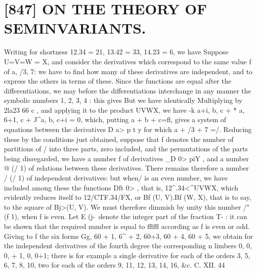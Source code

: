 \documentclass[11pt,a4paper]{book}
\begin{document}
{{\vspace{1em}

\section*{[847] ON THE THEORY OF SEMINVARIANTS.}


Writing for shortness 12.34 = 21, 13.42 = 33, 14.23 = 6, we have Suppose U=V=W = X, and consider the derivatives which correspond to the same value f of a, /3, 7: we have to find how many of these derivatives are independent, and to express the others in terms of these. Since the functions are equal after the differentiations, we may before the differentiations interchange in any manner the symbolic numbers 1, 2, 3, 4 : this gives But we have identically Multiplying by 2la23 66 c , and applying it to the product UVWX, we have -k a+i, b, c + * a, 6+1, c + J^a, b, c+i = 0, which, putting a + b + c=fl, gives a system of equations between the derivatives D a> p t y for which a + /3 + 7 =/. Reducing these by the conditions just obtained, suppose that f denotes the number of partitions of / into three parts, zero included, and the permutations of the parts being disregarded, we have a number f of derivatives _D 0> piY , and a number @ (/ 1) of relations between these derivatives. There remains therefore a number / (/ 1) of independent derivatives: but when/ is an even number, we have included among these the functions Dft 0> , that is, 12^.34<^UVWX, which evidently reduces itself to 12/CTF.34/FX, or Bf (U, V).Bf (W, X), that is to say, to the square of Bj>(U, V). We must therefore dimmish by unity this number /" (f 1), when f is even. Let E (j-\ denote the integer part of the fraction T- : it can be shown that the required number is equal to fflffl according as f is even or odd. Giving to f the six forms Gg, 60 + 1, 6^ + 2, 60+3, 60 + 4, 60 + 5, we obtain for the independent derivatives of the fourth degree the corresponding n limbers 0, 0, 0, + 1, 0, 0+1; there is for example a single derivative for each of the orders 3, 5, 6, 7, 8, 10, two for each of the orders 9, 11, 12, 13, 14, 16, &c. C. XII. 44

}}
\end{document}
